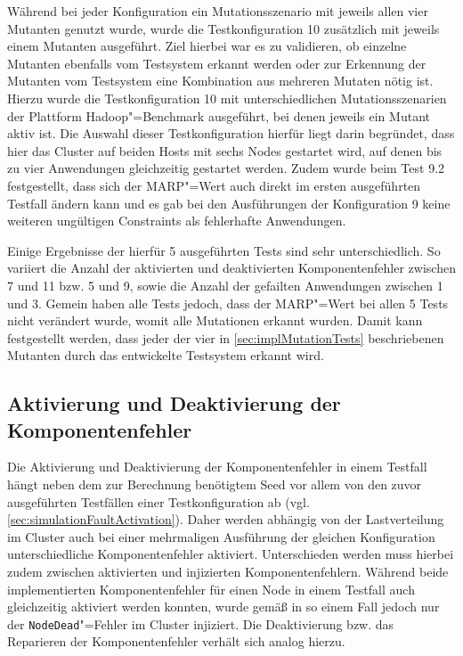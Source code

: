 Während bei jeder Konfiguration ein Mutationsszenario mit jeweils allen vier Mutanten genutzt wurde, wurde die Testkonfiguration 10 zusätzlich mit jeweils einem Mutanten ausgeführt.
Ziel hierbei war es zu validieren, ob einzelne Mutanten ebenfalls vom Testsystem erkannt werden oder zur Erkennung der Mutanten vom Testsystem eine Kombination aus mehreren Mutaten nötig ist.
Hierzu wurde die Testkonfiguration 10 mit unterschiedlichen Mutationsszenarien der Plattform Hadoop"=Benchmark ausgeführt, bei denen jeweils ein Mutant aktiv ist.
Die Auswahl dieser Testkonfiguration hierfür liegt darin begründet, dass hier das Cluster auf beiden Hosts mit sechs Nodes gestartet wird, auf denen bis zu vier Anwendungen gleichzeitig gestartet werden.
Zudem wurde beim Test 9.2 festgestellt, dass sich der \ac{MARP}"=Wert auch direkt im ersten ausgeführten Testfall ändern kann und es gab bei den Ausführungen der Konfiguration 9 keine weiteren ungültigen Constraints als fehlerhafte Anwendungen.

Einige Ergebnisse der hierfür 5 ausgeführten Tests sind sehr unterschiedlich.
So variiert die Anzahl der aktivierten und deaktivierten Komponentenfehler zwischen 7 und 11 bzw. 5 und 9, sowie die Anzahl der gefailten Anwendungen zwischen 1 und 3.
Gemein haben alle Tests jedoch, dass der \ac{MARP}"=Wert bei allen 5 Tests nicht verändert wurde, womit alle Mutationen erkannt wurden.
Damit kann festgestellt werden, dass jeder der vier in \autoref{sec:implMutationTests} beschriebenen Mutanten durch das entwickelte Testsystem erkannt wird.

\subsection{Aktivierung und Deaktivierung der Komponentenfehler}
\label{sec:faultInjectionEval}

Die Aktivierung und Deaktivierung der Komponentenfehler in einem Testfall hängt neben dem zur Berechnung benötigtem Seed vor allem von den zuvor ausgeführten Testfällen einer Testkonfiguration ab (vgl. \autoref{sec:simulationFaultActivation}).
Daher werden abhängig von der Lastverteilung im Cluster auch bei einer mehrmaligen Ausführung der gleichen Konfiguration \uU unterschiedliche Komponentenfehler aktiviert.
Unterschieden werden muss hierbei zudem zwischen aktivierten und injizierten Komponentenfehlern.
Während beide implementierten Komponentenfehler für einen Node in einem Testfall auch gleichzeitig aktiviert werden konnten, wurde gemäß  in so einem Fall jedoch nur der \texttt{NodeDead}"=Fehler im Cluster injiziert.
Die Deaktivierung bzw. das Reparieren der Komponentenfehler verhält sich analog hierzu.

